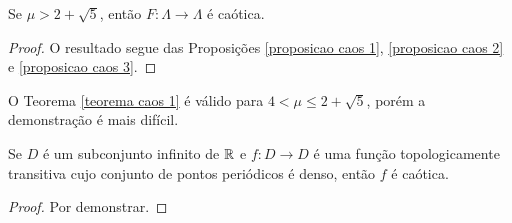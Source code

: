 \begin{theorem}
\label{teorema caos 1}
Se $\mu > 2 + \sqrt{5}$, então $F: \Lambda \to \Lambda$ é caótica.
\end{theorem}

\begin{proof}
O resultado segue das Proposições \ref{proposicao caos 1}, \ref{proposicao caos 2} e \ref{proposicao caos 3}.
\end{proof}

O Teorema \ref{teorema caos 1} é válido para $4 < \mu \leq 2 + \sqrt{5}$, porém a demonstração é mais difícil.

\begin{theorem}
\label{teorema caos 2}
Se $D$ é um subconjunto infinito de $\mathbb{R}$ e $f: D \to D$ é uma função topologicamente transitiva cujo conjunto de pontos periódicos é denso, então $f$ é caótica.
\end{theorem}

\begin{proof}
Por demonstrar.
\end{proof}
